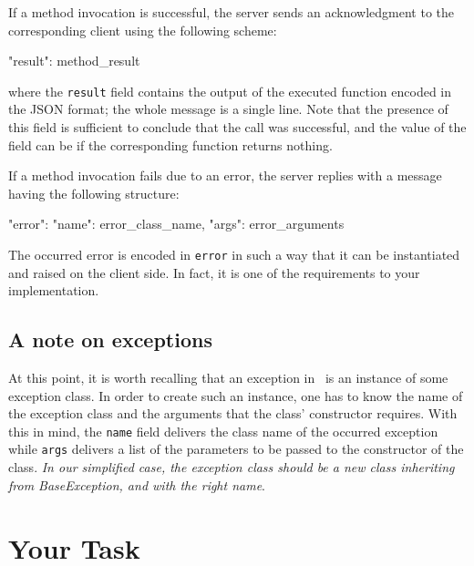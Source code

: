 \documentclass[a4paper]{article}
\begin{document}
If a method invocation is successful, the server sends an acknowledgment to the
corresponding client using the following scheme:
\begin{json}
{
    "result": method_result
}
\end{json}
where the \texttt{result} field contains the output of the executed function
encoded in the JSON format; the whole message is a single line. Note that the
presence of this field is sufficient to conclude that the call was successful,
and the value of the field can be  if the corresponding function
returns nothing.

If a method invocation fails due to an error, the server replies with a message
having the following structure:
\begin{json}
{
    "error": {
        "name": error_class_name,
        "args": error_arguments
    }
}
\end{json}

The occurred error is encoded in \texttt{error} in such a way that it
can be instantiated and raised on the client side. In fact, it is one
of the requirements to your implementation.

\subsection{A note on exceptions}

At this point, it is worth recalling that an exception in \python\ is
an instance of some exception class. In order to create such an
instance, one has to know the name of the exception class and the
arguments that the class' constructor requires. With this in mind, the
\texttt{name} field delivers the class name of the occurred exception
while \texttt{args} delivers a list of the parameters to be passed to
the constructor of the class. \emph{In our simplified case, the
  exception class should be a new class inheriting from BaseException,
  and with the right name}.

\section{Your Task}
\end{document}
